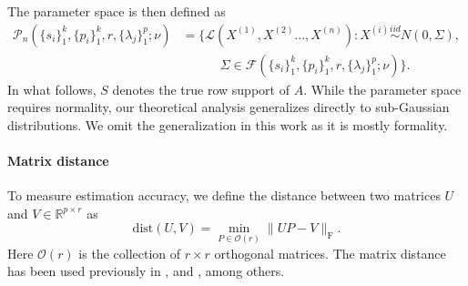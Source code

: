\documentclass[11pt]{article}
\newcommand{\nb}[1]{\textcolor{orange}{\texttt{[#1]}}}
\newcommand{\gsc}[1]{\textcolor{blue}{\texttt{[#1]}}}
\newcommand{\red}{\color{red}}
\newcommand{\hs}{s'}
\newcommand{\gd}{\overline{V}}
\newcommand{\0}{{\mathbf{0}}}
\newcommand{\ssecond}{{\widehat{\Sigma}}}
\newcommand{\szerosecond}{{\widehat{\Sigma}_0}}
\begin{document}
The parameter space is then defined  as
\begin{equation}
      \label{eq:para-space}
\begin{aligned}
\mathcal{P}_n( \{s_i\}_1^k,\{p_i\}_1^k,r,\{\lambda_j\}_1^p;\nu)& =\big\{\mathcal{L}(X^{(1)},X^{(2)}...,X^{(n)}): X^{(i)}\stackrel{iid}{\sim} N(0,\Sigma),\\ 
&\quad\qquad\Sigma\in\mathcal{F}( \{s_i\}_1^k,\{p_i\}_1^k,r,\{\lambda_j\}_1^p;\nu) 
\big\}.
\end{aligned}
\end{equation}
In what follows, $S$ denotes the true row support of $A$. 
While the parameter space requires normality, our theoretical analysis generalizes directly to sub-Gaussian distributions. We omit the generalization in this work as it is mostly formality.


\paragraph{Matrix distance}
To measure estimation accuracy, we define the distance between two matrices $U$ and $V\in\mathbb{R}^{p\times r}$ as
\begin{equation}\label{eq:mat-dist}
\mathrm{dist}(U,V)=\min_{P\in\mathcal{O}(r)}\|UP-V\|_\mathrm{F}.
\end{equation}
Here $\mathcal{O}(r)$ is the collection of $r\times r$ orthogonal matrices.
The matrix distance has been used previously in  \cite{ge2017no}, \cite{tu2015low} and \cite{golub2012matrix}, among others.
\end{document}

